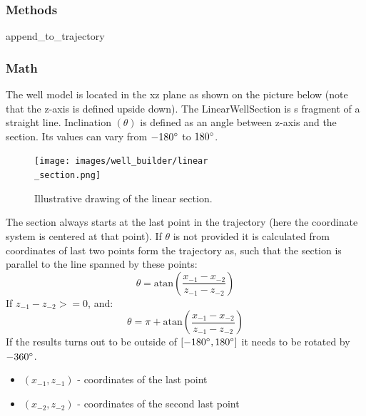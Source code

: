 \documentclass[english,10pt,a4paper]{article}
\begin{document}
	\subsubsection{Methods}
	\begin{description}
		\item[\colorbox{gray!20}{append\_to\_trajectory}] \hfill
	\end{description}
	\subsubsection{Math}
	The well model is located in the xz plane as shown on the picture below (note that the z-axis is defined upside down). The LinearWellSection is s fragment of a straight line. Inclination $(\theta)$ is defined as an angle between z-axis and the section. Its values can vary from $-180\degree$ to $180\degree$.
	\begin{figure}[H]
		\centering
		\texttt{[image: images/well\_builder/linear\\\_section.png]}
		\caption{Illustrative drawing of the linear section.}
		\label{linear_section}
	\end{figure}
	The section always starts at the last point in the trajectory (here the coordinate system is centered at that point). If $\theta$ is not provided it is calculated from coordinates of last two points form the trajectory as, such that the section is parallel to the line spanned by these points:
	\begin{equation}
		\theta = \mathrm{atan}\left(\frac{x_{-1} - x_{-2}}{z_{-1} - z_{-2}}\right)
	\end{equation}
	If $z_{-1} - z_{-2} >= 0$, and:
	\begin{equation}
		\theta = \pi + \mathrm{atan}\left(\frac{x_{-1} - x_{-2}}{z_{-1} - z_{-2}}\right)
	\end{equation}
	If the results turns out to be outside of $[-180\degree, 180\degree]$ it needs to be rotated by $-360\degree$.
	\begin{itemize}
		\item $(x_{-1}, z_{-1})$ - coordinates of the last point
		\item $(x_{-2}, z_{-2})$ - coordinates of the second last point
	\end{itemize}
\end{document}
